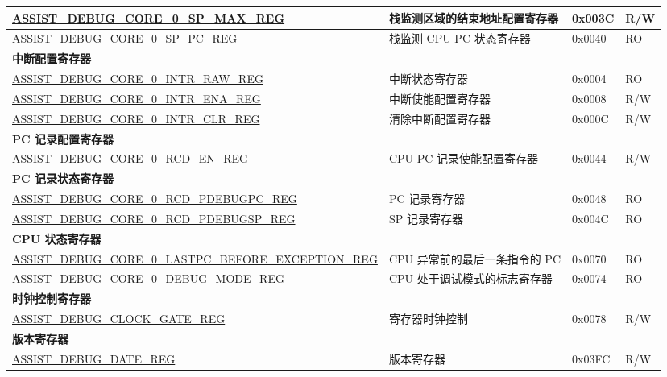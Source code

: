 \begin{longtable}{ | l| m{3.2cm} | l | l | }
\hyperref[regdesc:ASSISTDEBUGCORE0SPMAXREG]{ASSIST\_DEBUG\_CORE\_0\_SP\_MAX\_REG} & 栈监测区域的结束地址配置寄存器 & 0x003C &R/W \\ \hline
\hyperref[regdesc:ASSISTDEBUGCORE0SPPCREG]{ASSIST\_DEBUG\_CORE\_0\_SP\_PC\_REG} & 栈监测 CPU PC 状态寄存器 & 0x0040 & RO \\ \hline
\multicolumn{4}{|l|}{\textbf{中断配置寄存器}} \\ \hline
\hyperref[regdesc:ASSISTDEBUGCORE0INTRRAWREG]{ASSIST\_DEBUG\_CORE\_0\_INTR\_RAW\_REG} & 中断状态寄存器 & 0x0004 & RO \\ \hline
\hyperref[regdesc:ASSISTDEBUGCORE0INTRENAREG]{ASSIST\_DEBUG\_CORE\_0\_INTR\_ENA\_REG} & 中断使能配置寄存器 & 0x0008 & R/W \\ \hline
\hyperref[regdesc:ASSISTDEBUGCORE0INTRCLRREG]{ASSIST\_DEBUG\_CORE\_0\_INTR\_CLR\_REG} & 清除中断配置寄存器 & 0x000C & R/W \\ \hline
\multicolumn{4}{|l|}{\textbf{PC 记录配置寄存器}} \\ \hline
\hyperref[regdesc:ASSISTDEBUGCORE0RCDENREG]{ASSIST\_DEBUG\_CORE\_0\_RCD\_EN\_REG} & CPU PC 记录使能配置寄存器 & 0x0044 & R/W \\ \hline
\multicolumn{4}{|l|}{\textbf{PC 记录状态寄存器}} \\ \hline
\hyperref[regdesc:ASSISTDEBUGCORE0RCDPDEBUGPCREG]{ASSIST\_DEBUG\_CORE\_0\_RCD\_PDEBUGPC\_REG} & PC 记录寄存器 & 0x0048 & RO \\ \hline
\hyperref[regdesc:ASSISTDEBUGCORE0RCDPDEBUGSPREG]{ASSIST\_DEBUG\_CORE\_0\_RCD\_PDEBUGSP\_REG} & SP 记录寄存器 & 0x004C & RO \\ \hline
\multicolumn{4}{|l|}{\textbf{CPU 状态寄存器}} \\ \hline
\hyperref[regdesc:ASSISTDEBUGCORE0LASTPCBEFOREEXCEPTIONREG]{ASSIST\_DEBUG\_CORE\_0\_LASTPC\_BEFORE\_EXCEPTION\_REG} & CPU 异常前的最后一条指令的 PC  & 0x0070 & RO \\ \hline
\hyperref[regdesc:ASSISTDEBUGCORE0DEBUGMODEREG]{ASSIST\_DEBUG\_CORE\_0\_DEBUG\_MODE\_REG} & CPU 处于调试模式的标志寄存器 & 0x0074 & RO \\ \hline
\multicolumn{4}{|l|}{\textbf{时钟控制寄存器}} \\ \hline
\hyperref[regdesc:ASSISTDEBUGCLOCKGATEREG]{ASSIST\_DEBUG\_CLOCK\_GATE\_REG} & 寄存器时钟控制 & 0x0078 & R/W \\ \hline
\multicolumn{4}{|l|}{\textbf{版本寄存器}} \\ \hline
\hyperref[regdesc:ASSISTDEBUGDATEREG]{ASSIST\_DEBUG\_DATE\_REG} & 版本寄存器 & 0x03FC & R/W \\ \hline
\end{longtable}
